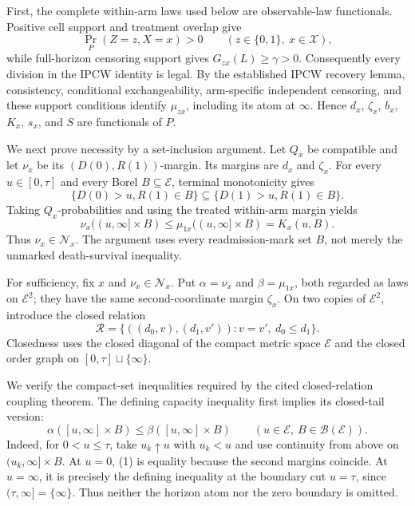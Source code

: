 First, the complete within-arm laws used below are observable-law functionals.  Positive cell support and treatment overlap give
\[
 \Pr_P(Z=z,X=x)>0
 \qquad(z\in\{0,1\},\ x\in\mathcal X),
\]
while full-horizon censoring support gives \(G_{zx}(L)\geq\gamma>0\).  Consequently every division in the IPCW identity is legal.  By the established IPCW recovery lemma, consistency, conditional exchangeability, arm-specific independent censoring, and these support conditions identify \(\mu_{zx}\), including its atom at \(\infty\).  Hence \(d_x\), \(\zeta_x\), \(b_x\), \(K_x\), \(s_x\), and \(S\) are functionals of \(P\).

We next prove necessity by a set-inclusion argument.  Let \(Q_x\) be compatible and let \(\nu_x\) be its \((D(0),R(1))\)-margin.  Its margins are \(d_x\) and \(\zeta_x\).  For every \(u\in[0,\tau]\) and every Borel \(B\subseteq\mathcal E\), terminal monotonicity gives
\[
 \{D(0)>u,R(1)\in B\}
 \subseteq
 \{D(1)>u,R(1)\in B\}.
\]
Taking \(Q_x\)-probabilities and using the treated within-arm margin yields
\[
 \nu_x((u,\infty]\times B)
 \leq \mu_{1x}((u,\infty]\times B)
 =K_x(u,B).
\]
Thus \(\nu_x\in\mathcal N_x\).  The argument uses every readmission-mark set \(B\), not merely the unmarked death-survival inequality.

For sufficiency, fix \(x\) and \(\nu_x\in\mathcal N_x\).  Put \(\alpha=\nu_x\) and \(\beta=\mu_{1x}\), both regarded as laws on \(\mathcal E^2\); they have the same second-coordinate margin \(\zeta_x\).  On two copies of \(\mathcal E^2\), introduce the closed relation
\[
 \mathcal R
 =\{((d_0,v),(d_1,v')):v=v',\ d_0\leq d_1\}.
\]
Closedness uses the closed diagonal of the compact metric space \(\mathcal E\) and the closed order graph on \([0,\tau]\sqcup\{\infty\}\).

We verify the compact-set inequalities required by the cited closed-relation coupling theorem.  The defining capacity inequality first implies its closed-tail version:
\[
 \alpha([u,\infty]\times B)\leq\beta([u,\infty]\times B)
 \qquad(u\in\mathcal E,\ B\in\mathscr B(\mathcal E)).                                      \tag{1}
\]
Indeed, for \(0<u\leq\tau\), take \(u_k\uparrow u\) with \(u_k<u\) and use continuity from above on \((u_k,\infty]\times B\).  At \(u=0\), (1) is equality because the second margins coincide.  At \(u=\infty\), it is precisely the defining inequality at the boundary cut \(u=\tau\), since \((\tau,\infty]=\{\infty\}\).  Thus neither the horizon atom nor the zero boundary is omitted.

